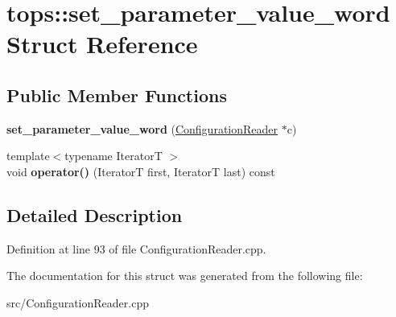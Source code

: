\hypertarget{structtops_1_1set__parameter__value__word}{}\section{tops\+:\+:set\+\_\+parameter\+\_\+value\+\_\+word Struct Reference}
\label{structtops_1_1set__parameter__value__word}
\subsection*{Public Member Functions}
\begin{DoxyCompactItemize}
\item 
\mbox{\label{structtops_1_1set__parameter__value__word_ad0b7dbaa82af7d535449f0aa5457152b}} 
{\bfseries set\+\_\+parameter\+\_\+value\+\_\+word} (\hyperlink{classtops_1_1ConfigurationReader}{Configuration\+Reader} $\ast$c)
\item 
\mbox{\label{structtops_1_1set__parameter__value__word_a802b445610c6910dc9a48c0f5cb4a5f0}} 
{\footnotesize template$<$typename IteratorT $>$ }\\void {\bfseries operator()} (IteratorT first, IteratorT last) const
\end{DoxyCompactItemize}


\subsection{Detailed Description}


Definition at line 93 of file Configuration\+Reader.\+cpp.



The documentation for this struct was generated from the following file\+:\begin{DoxyCompactItemize}
\item 
src/Configuration\+Reader.\+cpp\end{DoxyCompactItemize}

